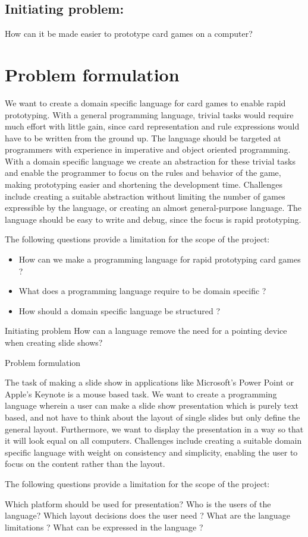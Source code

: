 \section{Initiating problem:}
How can it be made easier to prototype card games on a computer? 
\chapter{Problem formulation}
We want to create a domain specific language for card games to enable rapid prototyping. With a 
general programming language, trivial tasks would require much effort with little gain, since card 
representation and rule expressions would have to be written from the ground up. The language should be targeted at programmers with experience in imperative and object oriented programming. With a domain specific language we create an abstraction for these trivial tasks and enable the programmer to focus on the rules and behavior of the game, making prototyping easier and shortening the development time. 
Challenges include creating a suitable abstraction without limiting the number of games expressible
by the language, or creating an almost general-purpose language. The language should be easy to write and debug, since the focus is rapid prototyping.

The following questions provide a limitation for the scope of the project:

\begin{itemize}
\item How can we make a programming language for rapid prototyping card games ?
\item What does a programming language require to be domain specific ?
\item How should a domain specific language be structured ?
\end{itemize}



Initiating problem
How can a language remove the need for a pointing device when creating slide shows?

Problem formulation

The task of making a slide show in applications like Microsoft’s Power Point or Apple’s Keynote is a mouse based task. We want to create a programming language wherein a user can make a slide show presentation which is purely text based, and not have to think about the layout of single slides but only define the general layout. Furthermore, we want to display the presentation in a way so that it will look equal on all computers. 
Challenges include creating a suitable domain specific language with weight on consistency and simplicity, enabling the user to focus on the content rather than the layout.

The following questions provide a limitation for the scope of the project:

Which platform should be used for presentation?
Who is the users of the language?
Which layout decisions does the user need ?
What are the language limitations ? What can be expressed in the language ?